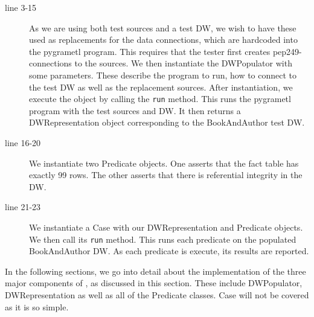 
\begin{description}
\item[line 3-15] As we are using both test sources and a test DW, we wish to have these used as replacements for the data connections, which are hardcoded into the pygrametl program. This requires that the tester first creates pep249-connections to the sources. We then instantiate the DWPopulator with some parameters. These describe the program to run, how to connect to the test DW as well as the replacement sources.  After instantiation, we execute the object by calling the \texttt{run} method. This runs the pygrametl program with the test sources and DW. It then returns a DWRepresentation object corresponding to the BookAndAuthor test DW. 

\item[line 16-20] We instantiate two Predicate objects. One asserts that  the fact table has exactly 99 rows. The other asserts that there is referential integrity in the DW.

\item[line 21-23] We instantiate a Case with our DWRepresentation and Predicate objects. We then call its \texttt{run} method. This runs each predicate on the populated BookAndAuthor DW. As each predicate is execute, its results are reported.  
\end{description}

In the following sections, we go into detail about the implementation of the three major components of \FW{}, as discussed in this section. These include DWPopulator, DWRepresentation as well as all of the Predicate classes. Case will not be covered as it is so simple. 













